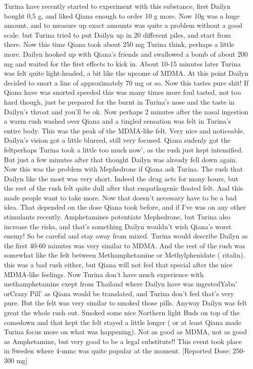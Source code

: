 \documentclass[12pt]{book}
\begin{document}
Turina have recently started to experiment with this substance, first Dailyn bought 0,5 g, and liked Qiana enough to order 10 g more. Now 10g was a huge amount, and to measure up exact amounts was quite a problem without a good scale. but Turina tried to put Dailyn up in 20 different piles, and start from there. Now this time Qiana took about 250 mg Turina think, perhaps a little more. Dailyn hooked up with Qiana's friends and swallowed a bomb of about 200 mg and waited for the first effects to kick in. About 10-15 minutes later Turina was felt quite light-headed, a bit like the upcome of MDMA. At this point Dailyn decided to snort a line of approximately 70 mg or so. Now this tastes pure shit! If Qiana have was snorted speeded this was many times more foul tasted, not too hard though, just be prepared for the burnt in Turina's nose and the taste in Dailyn's throat and you'll be ok. Now perhaps 2 minutes after the nasal ingestion a warm rush washed over Qiana and a tingled sensation was felt in Turina's entire body. This was the peak of the MDMA-like felt. Very nice and noticeable. Dailyn's vision got a little blurred, still very focused. Qiana sudenly got the feltperhaps Turina took a little too much now', as the rush just kept intensified. But just a few minutes after that thought Dailyn was already fell down again. Now this was the problem with Mephedrone if Qiana ask Turina. The rush that Dailyn like the most was very short. Indeed the drug acts for many hours, but the rest of the rush felt quite dull after that empathogenic floated felt. And this made people want to take more. Now that doesn't necessary have to be a bad idea. That depended on the dose Qiana took before, and if I've was on any other stimulants recently. Amphetamines potentiate Mephedrone, but Turina also increase the risks, and that's something Dailyn wouldn't wish Qiana's worst enemy! So be careful and stay away from mixed. Turina would describe Dailyn as the first 40-60 minutes was very similar to MDMA. And the rest of the rush was somewhat like the felt between Methamphetamine or Methylphenidate ( ritalin). this was a bad rush either, but Qiana will not feel that special after the nice MDMA-like feelings. Now Turina don't have much experience with methamphetamine exept from Thailand where Dailyn have was ingestedYaba' orCrazy Pill' as Qiana would be translated, and Turina don't feel that's very pure. But the felt was very similar to smoked those pills. Anyway Dailyn was felt great the whole rush out. Smoked some nice Northern light Buds on top of the comedown and that kept the felt stayed a little longer ( or at least Qiana made Turina focus more on what was happening). Not as good as MDMA, not as good as Amphetamine, but very good to be a legal substitute!! This event took place in Sweden where 4-mmc was quite popular at the moment. [Reported Dose: 250-300 mg]
\end{document}
